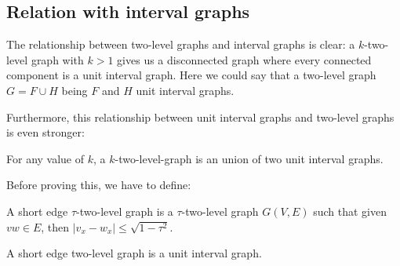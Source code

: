 \subsection{Relation with interval graphs}

The relationship between two-level graphs and interval graphs is clear: a $k$-two-level graph with $k > 1$ gives us a disconnected graph where every connected component is a unit interval graph. Here we could say that a two-level graph $G = F \cup H$ being $F$ and $H$ unit interval graphs.

Furthermore, this relationship between unit interval graphs and two-level graphs is even stronger:

\begin{theorem}
For any value of $k$, a $k$-two-level-graph is an union of two unit interval graphs.
\end{theorem}

Before proving this, we have to define:

\begin{defn}
  A short edge $\tau$-two-level graph is a $\tau$-two-level graph $G(V,E)$ such that given $vw \in E$, then $|v_x-w_x| \leq \sqrt{1-\tau^2}$.
\end{defn}

\begin{claim}
  A short edge two-level graph is a unit interval graph.
\end{claim}





